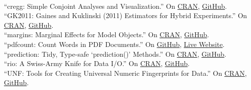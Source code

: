 \documentclass[12pt]{article}
\renewcommand{\section}[1]{\pagebreak[3]%
    \llap{\scshape\smash{\parbox[t]{\marginparwidth}{\raggedright {\color{lg}#1}}}}%
    \vspace{-\baselineskip}\par}
\newcommand{\topic}[1]{\pagebreak[3]\indent {\color{lg}{\footnotesize #1 }}\\}
\newcommand{\entry}[1]{\indent {\color{lg}\guillemotright}\hspace{2pt}#1\vspace{.25em}\\}
\begin{document}
\section{Software}
\topic{R Packages: Actively Maintained}
	\entry{``cregg: Simple Conjoint Analyses and Visualization.'' On \href{https://cran.r-project.org/package=cregg}{CRAN}, \href{https://github.com/leeper/cregg}{GitHub}.}
    \entry{``GK2011: Gaines and Kuklinski (2011) Estimators for Hybrid Experiments.'' On \href{https://cran.r-project.org/package=GK2011}{CRAN}, \href{https://github.com/leeper/GK2011}{GitHub}.}
	\entry{``margins: Marginal Effects for Model Objects.'' On \href{https://cran.r-project.org/package=margins}{CRAN}, \href{https://github.com/leeper/margins}{GitHub}.}
	\entry{``pdfcount: Count Words in PDF Documents.'' On \href{https://github.com/leeper/pdfcount}{GitHub}, \href{https://leeper.shinyapps.io/pdfcount/}{Live Website}.}
	\entry{``prediction: Tidy, Type-safe `prediction()' Methods.'' On \href{https://cran.r-project.org/package=prediction}{CRAN}, \href{https://github.com/leeper/prediction}{GitHub}.}
    \entry{``rio: A Swiss-Army Knife for Data I/O.'' On \href{https://cran.r-project.org/package=rio}{CRAN}, \href{https://github.com/leeper/rio}{GitHub}.}
	\entry{``UNF: Tools for Creating Universal Numeric Fingerprints for Data.'' On \href{https://cran.r-project.org/package=UNF}{CRAN}, \href{https://github.com/leeper/UNF}{GitHub}.}
\end{document}
